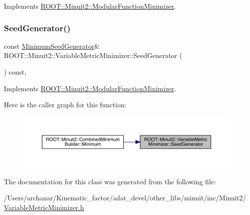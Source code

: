 Implements \mbox{\hyperlink{classROOT_1_1Minuit2_1_1ModularFunctionMinimizer_a742930de97b0ce9ba23773874ae0894b}{R\+O\+O\+T\+::\+Minuit2\+::\+Modular\+Function\+Minimizer}}.

\mbox{\label{classROOT_1_1Minuit2_1_1VariableMetricMinimizer_a8ac2123142283dd05611842236caeadb}} 
\subsubsection{\texorpdfstring{SeedGenerator()}{SeedGenerator()}\hspace{0.1cm}{\footnotesize\ttfamily [2/2]}}
{\footnotesize\ttfamily const \mbox{\hyperlink{classROOT_1_1Minuit2_1_1MinimumSeedGenerator}{Minimum\+Seed\+Generator}}\& R\+O\+O\+T\+::\+Minuit2\+::\+Variable\+Metric\+Minimizer\+::\+Seed\+Generator (\begin{DoxyParamCaption}{ }\end{DoxyParamCaption}) const\hspace{0.3cm}{\ttfamily [inline]}, {\ttfamily [virtual]}}



Implements \mbox{\hyperlink{classROOT_1_1Minuit2_1_1ModularFunctionMinimizer_a742930de97b0ce9ba23773874ae0894b}{R\+O\+O\+T\+::\+Minuit2\+::\+Modular\+Function\+Minimizer}}.

Here is the caller graph for this function\+:\nopagebreak
\begin{figure}[H]
\begin{center}
\leavevmode
\includegraphics[width=350pt]{d7/d5b/classROOT_1_1Minuit2_1_1VariableMetricMinimizer_a8ac2123142283dd05611842236caeadb_icgraph}
\end{center}
\end{figure}


The documentation for this class was generated from the following file\+:\begin{DoxyCompactItemize}
\item 
/\+Users/archanar/\+Kinematic\+\_\+factor/adat\+\_\+devel/other\+\_\+libs/minuit/inc/\+Minuit2/\mbox{\hyperlink{other__libs_2minuit_2inc_2Minuit2_2VariableMetricMinimizer_8h}{Variable\+Metric\+Minimizer.\+h}}\end{DoxyCompactItemize}
